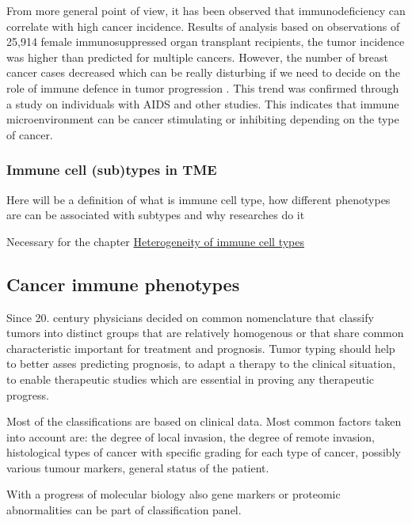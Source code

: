 \documentclass[12pt,]{book}
\theoremstyle{definition}
\theoremstyle{definition}
\theoremstyle{definition}
\theoremstyle{remark}
\begin{document}
From more general point of view, it has been observed that
immunodeficiency can correlate with high cancer incidence. Results of
analysis based on observations of 25,914 female immunosuppressed organ
transplant recipients, the tumor incidence was higher than predicted for
multiple cancers. However, the number of breast cancer cases decreased
which can be really disturbing if we need to decide on the role of
immune defence in tumor progression \citep{Stewart1995}. This trend was
confirmed through a study on individuals with AIDS and other studies.
This indicates that immune microenvironment can be cancer stimulating or
inhibiting depending on the type of cancer.

\hypertarget{immune-cell-subtypes-in-tme}{%
\subsubsection{Immune cell (sub)types in
TME}\label{immune-cell-subtypes-in-tme}}

Here will be a definition of what is immune cell type, how different
phenotypes are can be associated with subtypes and why researches do it

Necessary for the chapter \protect\hyperlink{map}{Heterogeneity of
immune cell types}

\hypertarget{cancer-immune-phenotypes}{%
\subsection{Cancer immune phenotypes}\label{cancer-immune-phenotypes}}

Since 20. century physicians decided on common nomenclature that
classify tumors into distinct groups that are relatively homogenous or
that share common characteristic important for treatment and prognosis.
Tumor typing should help to better asses predicting prognosis, to adapt
a therapy to the clinical situation, to enable therapeutic studies which
are essential in proving any therapeutic progress.

Most of the classifications are based on clinical data. Most common
factors taken into account are: the degree of local invasion, the degree
of remote invasion, histological types of cancer with specific grading
for each type of cancer, possibly various tumour markers, general status
of the patient.

With a progress of molecular biology also gene markers or proteomic
abnormalities can be part of classification panel.
\end{document}
